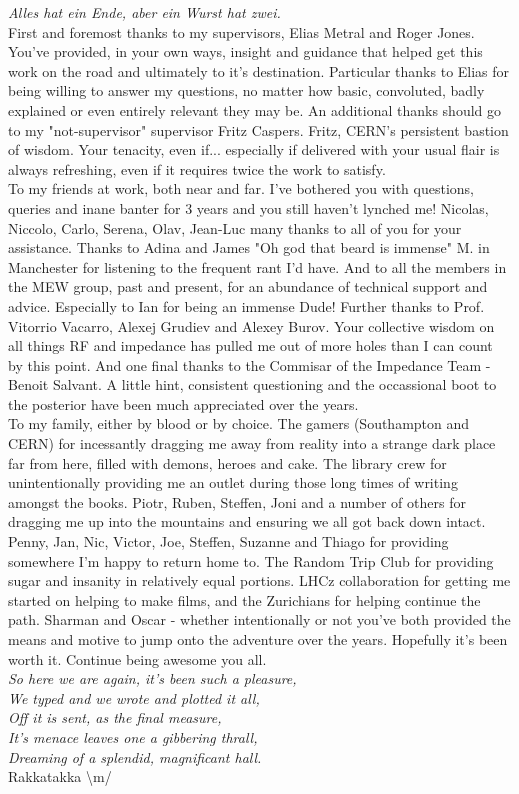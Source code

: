 \emph{Alles hat ein Ende, aber ein Wurst hat zwei.}
\\
First and foremost thanks to my supervisors, Elias Metral and Roger Jones. You've provided, in your own ways, insight and guidance that helped get this work on the road and ultimately to it's destination. Particular thanks to Elias for being willing to answer my questions, no matter how basic, convoluted, badly explained or even entirely relevant they may be. An additional thanks should go to my "not-supervisor" supervisor Fritz Caspers. Fritz, CERN's persistent bastion of wisdom. Your tenacity, even if... especially if delivered with your usual flair is always refreshing, even if it requires twice the work to satisfy.
\\
To my friends at work, both near and far. I've bothered you with questions, queries and inane banter for 3 years and you still haven't lynched me! Nicolas, Niccolo, Carlo, Serena, Olav, Jean-Luc many thanks to all of you for your assistance. Thanks to Adina and James "Oh god that beard is immense" M. in Manchester for listening to the frequent rant I'd have. And to all the members in the MEW group, past and present, for an abundance of technical support and advice. Especially to Ian for being an immense Dude! Further thanks to Prof. Vitorrio Vacarro, Alexej Grudiev and Alexey Burov. Your collective wisdom on all things RF and impedance has pulled me out of more holes than I can count by this point. And one final thanks to the Commisar of the Impedance Team - Benoit Salvant. A little hint, consistent questioning and the occassional boot to the posterior have been much appreciated over the years.
\\
To my family, either by blood or by choice. The gamers (Southampton and CERN) for incessantly dragging me away from reality into a strange dark place far from here, filled with demons, heroes and cake. The library crew for unintentionally providing me an outlet during those long times of writing amongst the books. Piotr, Ruben, Steffen, Joni and a number of others for dragging me up into the mountains and ensuring we all got back down intact. Penny, Jan, Nic, Victor, Joe, Steffen, Suzanne and Thiago for providing somewhere I'm happy to return home to. The Random Trip Club for providing sugar and insanity in relatively equal portions. LHCz collaboration for getting me started on helping to make films, and the Zurichians for helping continue the path. Sharman and Oscar - whether intentionally or not you've both provided the means and motive to jump onto the adventure over the years. Hopefully it's been worth it. Continue being awesome you all.
\\
\emph{So here we are again, it's been such a pleasure,
\\
We typed and we wrote and plotted it all,
\\ 
Off it is sent, as the final measure,
\\
It's menace leaves one a gibbering thrall,
\\
Dreaming of a splendid, magnificant hall.}
\\ Rakkatakka \textbackslash{}m/